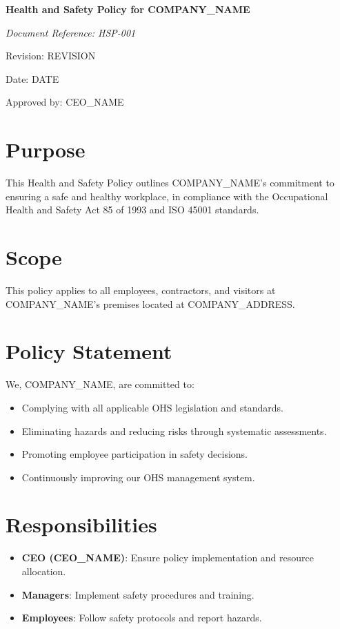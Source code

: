 \documentclass[12pt]{article}
\begin{document}
\begin{titlepage}
    \centering
    \vspace*{2cm}
    {\LARGE\bfseries Health and Safety Policy for {{COMPANY_NAME}}\par}
    \vspace{1cm}
    {\large\itshape Document Reference: HSP-001\par}
    \vspace{0.5cm}
    {\normalsize Revision: {{REVISION}}\par}
    \vspace{0.5cm}
    {\normalsize Date: {{DATE}}\par}
    \vspace{2cm}
    {\normalsize Approved by: {{CEO_NAME}}\par}
\end{titlepage}

\section{Purpose}
This Health and Safety Policy outlines {{COMPANY_NAME}}'s commitment to ensuring a safe and healthy workplace, in compliance with the Occupational Health and Safety Act 85 of 1993 and ISO 45001 standards.

\section{Scope}
This policy applies to all employees, contractors, and visitors at {{COMPANY_NAME}}'s premises located at {{COMPANY_ADDRESS}}.

\section{Policy Statement}
We, {{COMPANY_NAME}}, are committed to:
\begin{itemize}
    \item Complying with all applicable OHS legislation and standards.
    \item Eliminating hazards and reducing risks through systematic assessments.
    \item Promoting employee participation in safety decisions.
    \item Continuously improving our OHS management system.
\end{itemize}

\section{Responsibilities}
\begin{itemize}
    \item \textbf{CEO ({{CEO_NAME}})}: Ensure policy implementation and resource allocation.
    \item \textbf{Managers}: Implement safety procedures and training.
    \item \textbf{Employees}: Follow safety protocols and report hazards.
\end{itemize}
\end{document}
